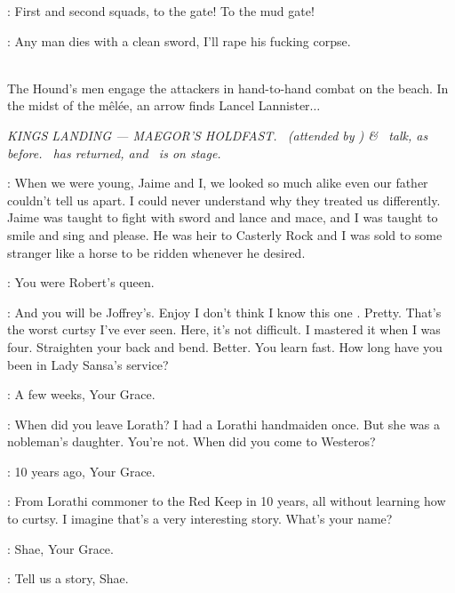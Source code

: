 \CAPTAIN: First and second squads, to the gate! To the mud gate! 


\HOUND: Any man dies with a clean sword, I'll rape his fucking corpse. 

\\
\n The Hound's men engage the attackers in hand-to-hand combat on the
beach. In the midst of the m\^el\'ee, an arrow finds Lancel
Lannister$\ldots$\\

\scene

\textit{KINGS LANDING --- MAEGOR'S HOLDFAST. \CERSEI ~(attended
by \SGNS) \& \SANSA ~talk, as before. \SERI ~has returned, and \SHAE
~is on stage.} 

\CERSEI: When we were young, Jaime and I, we looked so much alike  
even our father couldn't tell us apart. 
I could never understand why they treated us differently. 
Jaime was taught to fight with sword and lance and mace, and I was taught to smile and sing and please. 
He was heir to Casterly Rock and I was sold to some stranger like a horse to be ridden whenever he desired. 

\SANSA: You were Robert's queen. 

\CERSEI: And you will be Joffrey's. Enjoy  I don't
think I know this one . Pretty.  That's the worst curtsy I've ever seen. Here, it's
not difficult. I mastered it when I was four. Straighten your back and
bend.  Better. You learn fast. How
long have you been in Lady Sansa's service?

\SHAE: A few weeks, Your Grace. 

\CERSEI: When did you leave Lorath?  I had a Lorathi handmaiden once. But she was a nobleman's daughter. You're not. When did you come to Westeros? 

\SHAE: 10 years ago, Your Grace. 

\CERSEI: From Lorathi commoner to the Red Keep in 10 years, all without learning how to curtsy. I imagine that's a very interesting story. What's your name? 

\SHAE: Shae, Your Grace. 

\CERSEI: Tell us a story, Shae. 


